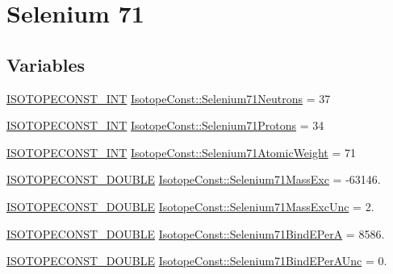 \hypertarget{group___isotope_const-_selenium-_se71}{}\section{Selenium 71}
\label{group___isotope_const-_selenium-_se71}
\subsection*{Variables}
\begin{DoxyCompactItemize}
\item 
\mbox{\hyperlink{group___isotope_const-_macros_ga5f18360b3e99483a35c32d789e62621c}{I\+S\+O\+T\+O\+P\+E\+C\+O\+N\+S\+T\+\_\+\+I\+NT}} \mbox{\hyperlink{group___isotope_const-_selenium-_se71_ga84a0c1c8e54724c075a1e27e708b0e3f}{Isotope\+Const\+::\+Selenium71\+Neutrons}} = 37
\item 
\mbox{\hyperlink{group___isotope_const-_macros_ga5f18360b3e99483a35c32d789e62621c}{I\+S\+O\+T\+O\+P\+E\+C\+O\+N\+S\+T\+\_\+\+I\+NT}} \mbox{\hyperlink{group___isotope_const-_selenium-_se71_gad9bf0b52b214c1d459042663d5e19a86}{Isotope\+Const\+::\+Selenium71\+Protons}} = 34
\item 
\mbox{\hyperlink{group___isotope_const-_macros_ga5f18360b3e99483a35c32d789e62621c}{I\+S\+O\+T\+O\+P\+E\+C\+O\+N\+S\+T\+\_\+\+I\+NT}} \mbox{\hyperlink{group___isotope_const-_selenium-_se71_gaf055c77bc480f35d683cbb3a92d636a9}{Isotope\+Const\+::\+Selenium71\+Atomic\+Weight}} = 71
\item 
\mbox{\hyperlink{group___isotope_const-_macros_ga8f45a7272ce02c0b4c65c44636ed719a}{I\+S\+O\+T\+O\+P\+E\+C\+O\+N\+S\+T\+\_\+\+D\+O\+U\+B\+LE}} \mbox{\hyperlink{group___isotope_const-_selenium-_se71_ga5aeb4b627f3ac5bddd59260a76f943f9}{Isotope\+Const\+::\+Selenium71\+Mass\+Exc}} = -\/63146.
\item 
\mbox{\hyperlink{group___isotope_const-_macros_ga8f45a7272ce02c0b4c65c44636ed719a}{I\+S\+O\+T\+O\+P\+E\+C\+O\+N\+S\+T\+\_\+\+D\+O\+U\+B\+LE}} \mbox{\hyperlink{group___isotope_const-_selenium-_se71_ga56b060a76f6f3e3de7626c5eb83a3fd3}{Isotope\+Const\+::\+Selenium71\+Mass\+Exc\+Unc}} = 2.
\item 
\mbox{\hyperlink{group___isotope_const-_macros_ga8f45a7272ce02c0b4c65c44636ed719a}{I\+S\+O\+T\+O\+P\+E\+C\+O\+N\+S\+T\+\_\+\+D\+O\+U\+B\+LE}} \mbox{\hyperlink{group___isotope_const-_selenium-_se71_ga7f3265722a8dbfae931cba9c9d99c195}{Isotope\+Const\+::\+Selenium71\+Bind\+E\+PerA}} = 8586.
\item 
\mbox{\hyperlink{group___isotope_const-_macros_ga8f45a7272ce02c0b4c65c44636ed719a}{I\+S\+O\+T\+O\+P\+E\+C\+O\+N\+S\+T\+\_\+\+D\+O\+U\+B\+LE}} \mbox{\hyperlink{group___isotope_const-_selenium-_se71_ga463e60a1b445aa1572b47da136808a48}{Isotope\+Const\+::\+Selenium71\+Bind\+E\+Per\+A\+Unc}} = 0.

\end{DoxyCompactItemize}
